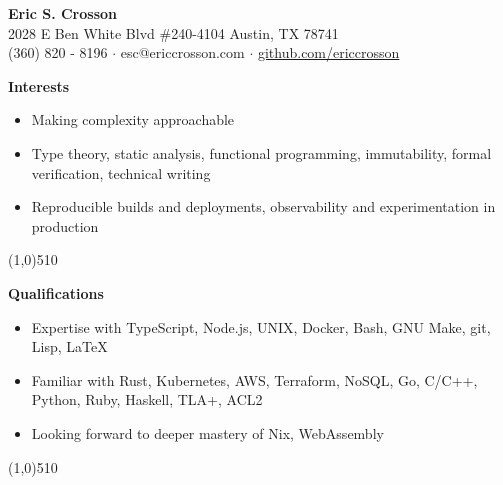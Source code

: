 \documentclass{report}
\newcommand{\cut}{\begin{center} \line(1,0){510} \end{center}}
\begin{document}
\pagestyle{empty}
\setlength\parindent{0pt}

\begin{center}
  \textbf{Eric S. Crosson} \\
  2028 E Ben White Blvd \#240-4104 Austin, TX 78741 \\
  (360) 820 - 8196 $\cdot$ esc@ericcrosson.com $\cdot$ \href{https://github.com/EricCrosson}{github.com/ericcrosson}
\end{center}

\textbf{Interests}
\begin{itemize}[label=$\cdot$]
\item Making complexity approachable
\item Type theory, static analysis, functional programming, immutability, formal verification, technical writing
\item Reproducible builds and deployments, observability and experimentation in production
\end{itemize}

\cut{}

\textbf{Qualifications}
\begin{itemize}[label=$\cdot$]
\item Expertise with TypeScript, Node.js, UNIX, Docker, Bash, GNU Make, git, Lisp, \LaTeX{}
\item Familiar with Rust, Kubernetes, AWS, Terraform, NoSQL, Go, C/C++, Python, Ruby, Haskell, TLA+, ACL2
\item Looking forward to deeper mastery of Nix, WebAssembly
\end{itemize}

\cut{}
\end{document}

